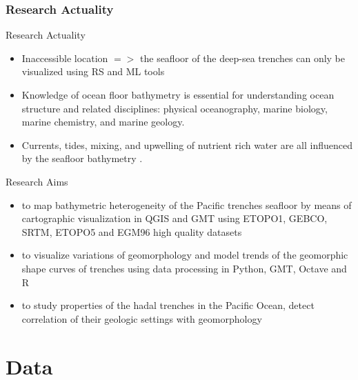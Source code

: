 \documentclass[pdflatex,compress,8pt,
	xcolor={dvipsnames,dvipsnames,svgnames,x11names,table},
	hyperref={colorlinks = true,breaklinks = true, urlcolor = NavyBlue, breaklinks = true}]{beamer}
\begin{document}
\begin{frame}\frametitle{Research Actuality}
\begin{exampleblock}{Research Actuality}
\begin{itemize}
            \item Inaccessible location $=>$ the seafloor of the deep-sea trenches can only be visualized using RS and ML tools 
            \item Knowledge of ocean floor bathymetry is essential for understanding ocean structure and related disciplines: physical oceanography, marine biology, marine chemistry, and marine geology. 
            \item Currents, tides, mixing, and upwelling of nutrient rich water are all influenced by the seafloor bathymetry \cite{SmithSandwell1997a}.            
\end{itemize}
\end{exampleblock}		
\begin{alertblock}{Research Aims}
\begin{itemize}
            \item to map bathymetric heterogeneity of the Pacific trenches seafloor by means of cartographic visualization in QGIS and GMT \cite{Wessel1998} using ETOPO1, GEBCO, SRTM, ETOPO5 and EGM96 high quality datasets \cite{WesselSmith1996}
             \item to visualize variations of geomorphology and model trends of the geomorphic shape curves of trenches using data processing in Python, GMT, Octave and R 
             \item to study properties of the hadal trenches in the Pacific Ocean, detect correlation of their geologic settings with geomorphology
\end{itemize}
\end{alertblock}		
\end{frame}

\section{Data}
\end{document}
